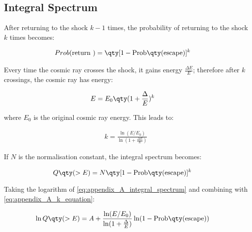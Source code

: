 \subsection{Integral Spectrum}

After returning to the shock $k-1$ times, the probability of returning to the shock $k$ times becomes:

\begin{equation}
    \begin{aligned}
    Prob(\text{return })&=\qty[1-\text{Prob}\qty(\text{escape})]^k
    \end{aligned}
\end{equation}

Every time the cosmic ray crosses the shock, it gains energy $\frac{\Delta E}{E}$; therefore after $k$ crossings, the cosmic ray has energy:

\begin{equation}
    \begin{aligned}
    E&=E_0\qty(1+\frac{\Delta}{E})^k
    \end{aligned}
\end{equation}

where $E_0$ is the original cosmic ray energy. This leads to:

\begin{equation}
    \begin{aligned}
    k=\frac{\ln(E/E_0)}{\ln(1+\frac{\Delta E}{E})}
    \end{aligned} \label{eq:appendix_A_k_equation}
\end{equation}

If $N$ is the normalisation constant, the integral spectrum becomes:

\begin{equation}
    \begin{aligned}
    Q\qty(>E)&=N\qty[1-\text{Prob}\qty(\text{escape})]^k
    \end{aligned} \label{eq:appendix_A_integral_spectrum}
\end{equation}

Taking the logarithm of \autoref{eq:appendix_A_integral_spectrum} and combining with \autoref{eq:appendix_A_k_equation}:

\begin{equation}
    \begin{aligned}
    \ln Q\qty(>E)&=A+\frac{\ln(E/E_0)}{\ln(1+\frac{\Delta}{E})}\ln(1-\text{Prob}\qty(\text{escape})) 
    \end{aligned} \label{eq:appendix_A_theoretial_spectrum}
\end{equation}

